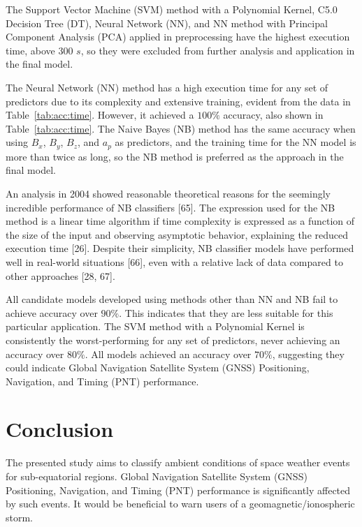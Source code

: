 \let\LaTeXcline\cline\documentclass[sn-mathphys-num]{sn-jnl}\let\cline\LaTeXcline
\begin{document}
The Support Vector Machine (SVM) method with a Polynomial Kernel, C5.0 Decision Tree (DT), Neural Network (NN), and NN method with Principal Component Analysis (PCA) applied in preprocessing have the highest execution time, above $300$ $s$, so they were excluded from further analysis and application in the final model.

The Neural Network (NN) method has a high execution time for any set of predictors due to its complexity and extensive training, evident from the data in Table~\ref{tab:acc:time}. However, it achieved a $100\%$ accuracy, also shown in Table~\ref{tab:acc:time}. The Naive Bayes (NB) method has the same accuracy when using $B_{x}$, $B_{y}$, $B_{z}$, and $a_{p}$ as predictors, and the training time for the NN model is more than twice as long, so the NB method is preferred as the approach in the final model.

An analysis in 2004 showed reasonable theoretical reasons for the seemingly incredible performance of NB classifiers [65]. The expression used for the NB method is a linear time algorithm if time complexity is expressed as a function of the size of the input and observing asymptotic behavior, explaining the reduced execution time [26]. Despite their simplicity, NB classifier models have performed well in real-world situations [66], even with a relative lack of data compared to other approaches [28, 67].

All candidate models developed using methods other than NN and NB fail to achieve accuracy over $90\%$. This indicates that they are less suitable for this particular application. The SVM method with a Polynomial Kernel is consistently the worst-performing for any set of predictors, never achieving an accuracy over $80\%$. All models achieved an accuracy over $70\%$, suggesting they could indicate Global Navigation Satellite System (GNSS) Positioning, Navigation, and Timing (PNT) performance.

\section{Conclusion}
\label{sec:Conclusion}

The presented study aims to classify ambient conditions of space weather events for sub-equatorial regions. Global Navigation Satellite System (GNSS) Positioning, Navigation, and Timing (PNT) performance is significantly affected by such events. It would be beneficial to warn users of a geomagnetic/ionospheric storm.
\end{document}
